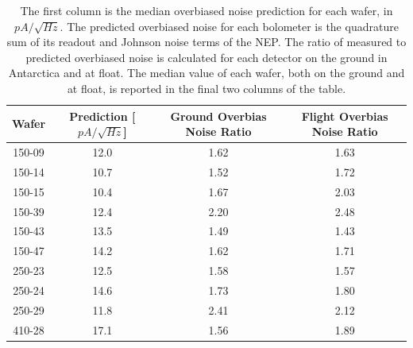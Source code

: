 \documentclass[../EBEXPaper2.tex]{subfiles}
\begin{document}
\begin{table}[ht!]
\begin{center}
\begin{tabular}{|c|c|c|c|}
\hline  Wafer & Prediction [$pA/\sqrt{Hz}$]& Ground Overbias Noise Ratio & Flight Overbias Noise Ratio \\
\hline 150-09 & 12.0 & 1.62 & 1.63 \\
\hline 150-14 & 10.7 & 1.52 & 1.72 \\
\hline 150-15 & 10.4 & 1.67 & 2.03 \\
\hline 150-39 & 12.4 & 2.20 & 2.48 \\
\hline 150-43 & 13.5 & 1.49 & 1.43 \\
\hline 150-47 & 14.2 & 1.62 & 1.71 \\
\hline 250-23 & 12.5 & 1.58 & 1.57 \\
\hline 250-24 & 14.6 & 1.73 & 1.80 \\
\hline 250-29 & 11.8 & 2.41 & 2.12 \\
\hline 410-28 & 17.1 & 1.56 & 1.89 \\
\hline
\end{tabular}
\end{center}
\caption{The first column is the median overbiased noise prediction for each wafer, in $pA/\sqrt{Hz}$. The predicted overbiased noise for each bolometer is the quadrature sum of its readout and Johnson noise terms of the \ac{NEP}. The ratio of measured to predicted overbiased noise is calculated for each detector on the ground in Antarctica and at float. The median value of each wafer, both on the ground and at float, is reported in the final two columns of the table.}
\label{overbias_noise_table}
\end{table}%
\end{document}
